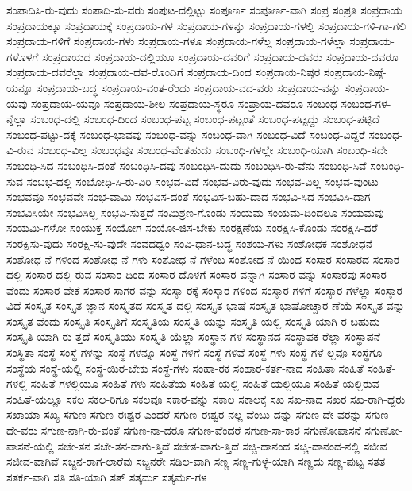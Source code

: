 {ಸಂಪಾದಿಸಿ-ರು-ವುದು
ಸಂಪಾದಿ-ಸು-ವರು
ಸಂಪುಟ-ದಲ್ಲಿಟ್ಟು
ಸಂಪೂರ್ಣ
ಸಂಪೂರ್ಣ-ವಾಗಿ
ಸಂಪ್ರ
ಸಂಪ್ರತಿ
ಸಂಪ್ರದಾಯ
ಸಂಪ್ರದಾಯಕ್ಕೂ
ಸಂಪ್ರದಾಯಕ್ಕೆ
ಸಂಪ್ರದಾಯ-ಗಳ
ಸಂಪ್ರದಾಯ-ಗಳನ್ನು
ಸಂಪ್ರದಾಯ-ಗಳಲ್ಲಿ
ಸಂಪ್ರದಾಯ-ಗಳಿ-ಗಾ-ಗಲಿ
ಸಂಪ್ರದಾಯ-ಗಳಿಗೆ
ಸಂಪ್ರದಾಯ-ಗಳು
ಸಂಪ್ರದಾಯ-ಗಳೂ
ಸಂಪ್ರದಾಯ-ಗಳೆಲ್ಲ
ಸಂಪ್ರದಾಯ-ಗಳೆಲ್ಲಾ
ಸಂಪ್ರದಾಯ-ಗಳೊಳಗೆ
ಸಂಪ್ರದಾಯದ
ಸಂಪ್ರದಾಯ-ದಲ್ಲಿಯೂ
ಸಂಪ್ರದಾಯ-ದವರಿಗೆ
ಸಂಪ್ರದಾಯ-ದವರು
ಸಂಪ್ರದಾಯ-ದವರೂ
ಸಂಪ್ರದಾಯ-ದವರೆಲ್ಲಾ
ಸಂಪ್ರದಾಯ-ದವ-ರೊಂದಿಗೆ
ಸಂಪ್ರದಾಯ-ದಿಂದ
ಸಂಪ್ರದಾಯ-ನಿಷ್ಠರ
ಸಂಪ್ರದಾಯ-ನಿಷ್ಠೆ-ಯನ್ನೂ
ಸಂಪ್ರದಾಯ-ಬದ್ಧ
ಸಂಪ್ರದಾಯ-ವಂತ-ರೆಂದು
ಸಂಪ್ರದಾಯ-ವದ-ವರು
ಸಂಪ್ರದಾಯ-ವನ್ನು
ಸಂಪ್ರದಾಯ-ಯವು
ಸಂಪ್ರದಾಯ-ಯವೂ
ಸಂಪ್ರದಾಯ-ಶೀಲ
ಸಂಪ್ರದಾಯ-ಸ್ಥರೂ
ಸಂಪ್ರಾಯ-ದವರೂ
ಸಂಬಂಧ
ಸಂಬಂಧ-ಗಳ-ನ್ನೆಲ್ಲಾ
ಸಂಬಂಧ-ದಲ್ಲಿ
ಸಂಬಂಧ-ದಿಂದ
ಸಂಬಂಧ-ಪಟ್ಟ
ಸಂಬಂಧ-ಪಟ್ಟಂತೆ
ಸಂಬಂಧ-ಪಟ್ಟದ್ದು
ಸಂಬಂಧ-ಪಟ್ಟಿದೆ
ಸಂಬಂಧ-ಪಟ್ಟು-ದಕ್ಕೆ
ಸಂಬಂಧ-ಭಾವವು
ಸಂಬಂಧ-ವನ್ನು
ಸಂಬಂಧ-ವಾಗಿ
ಸಂಬಂಧ-ವಿದೆ
ಸಂಬಂಧ-ವಿದ್ದರೆ
ಸಂಬಂಧ-ವಿ-ರುವ
ಸಂಬಂಧ-ವಿಲ್ಲ
ಸಂಬಂಧವೂ
ಸಂಬಂಧ-ವೆಂತಹುದು
ಸಂಬಂಧಿ-ಗಳಲ್ಲೇ
ಸಂಬಂಧಿ-ಯಾಗಿ
ಸಂಬಂಧಿ-ಸದೇ
ಸಂಬಂಧಿ-ಸಿದ
ಸಂಬಂಧಿಸಿ-ದಂತೆ
ಸಂಬಂಧಿಸಿ-ದವು
ಸಂಬಂಧಿಸಿ-ದುದು
ಸಂಬಂಧಿಸಿ-ರು-ವೆನು
ಸಂಬಂಧಿ-ಸಿವೆ
ಸಂಬಂಧಿ-ಸುವ
ಸಂಬಭ-ದಲ್ಲಿ
ಸಂಬೋಧಿ-ಸಿ-ರು-ವಿರಿ
ಸಂಭವ-ವಿದೆ
ಸಂಭವ-ವಿರು-ವುದು
ಸಂಭವ-ವಿಲ್ಲ
ಸಂಭವ-ವುಂಟು
ಸಂಭವವೂ
ಸಂಭವವೇ
ಸಂಭ-ವಾಮಿ
ಸಂಭವಿಸ-ದಂತೆ
ಸಂಭವಿಸ-ಬಹು-ದಾದ
ಸಂಭವಿ-ಸಿದ
ಸಂಭವಿಸಿ-ದಾಗ
ಸಂಭವಿಸಿಯೇ
ಸಂಭವಿಸಿಲ್ಲ
ಸಂಭವಿ-ಸುತ್ತದೆ
ಸಂಮಿಶ್ರಣ-ಗೊಂಡು
ಸಂಯಮ
ಸಂಯಮ-ದಿಂದಲೂ
ಸಂಯಮವು
ಸಂಯಮಿ-ಗಳೋ
ಸಂಯುಕ್ತ
ಸಂಯೋಗ
ಸಂಯೋ-ಜಿಸ-ಬೇಕು
ಸಂರಕ್ಷಣೆಯ
ಸಂರಕ್ಷಿಸಿ-ಕೊಂಡು
ಸಂರಕ್ಷಿಸಿ-ದರೆ
ಸಂರಕ್ಷಿಸು-ವುದು
ಸಂರಕ್ಷಿ-ಸು-ವುದೇ
ಸಂವದಧ್ವಂ
ಸಂವಿ-ಧಾನ-ಬದ್ಧ
ಸಂಶಯ-ಗಳು
ಸಂಶೋಧಕ
ಸಂಶೋಧನೆ
ಸಂಶೋಧ-ನೆ-ಗಳಿಂದ
ಸಂಶೋಧ-ನೆ-ಗಳು
ಸಂಶೋಧ-ನೆ-ಗಳೆಂಬ
ಸಂಶೋಧ-ನೆ-ಯಿಂದ
ಸಂಸಾರ
ಸಂಸಾರದ
ಸಂಸಾರ-ದಲ್ಲಿ
ಸಂಸಾರ-ದಲ್ಲಿ-ರುವ
ಸಂಸಾರ-ದಿಂದ
ಸಂಸಾರ-ದೊಳಗೆ
ಸಂಸಾರ-ವನ್ನಾಗಿ
ಸಂಸಾರ-ವನ್ನು
ಸಂಸಾರವು
ಸಂಸಾರ-ವೆಂದು
ಸಂಸಾರ-ವೇಕೆ
ಸಂಸಾರ-ಸಾಗರ-ವನ್ನು
ಸಂಸ್ಕಾ-ರಕ್ಕೆ
ಸಂಸ್ಕಾರ-ಗಳಿಂದ
ಸಂಸ್ಕಾರ-ಗಳಿಗೆ
ಸಂಸ್ಕಾರ-ಗಳೆಲ್ಲಾ
ಸಂಸ್ಕಾರ-ವಿದೆ
ಸಂಸ್ಕೃತ
ಸಂಸ್ಕೃತ-ಜ್ಞಾನ
ಸಂಸ್ಕೃತದ
ಸಂಸ್ಕೃತ-ದಲ್ಲಿ
ಸಂಸ್ಕೃತ-ಭಾಷೆ
ಸಂಸ್ಕೃತ-ಭಾಷೋಚ್ಚಾರ-ಣೆಯೆ
ಸಂಸ್ಕೃತ-ವನ್ನು
ಸಂಸ್ಕೃತ-ವೆಂದು
ಸಂಸ್ಕೃತಿ
ಸಂಸ್ಕೃತಿಗೆ
ಸಂಸ್ಕೃತಿಯ
ಸಂಸ್ಕೃತಿ-ಯನ್ನು
ಸಂಸ್ಕೃತಿ-ಯಲ್ಲಿ
ಸಂಸ್ಕೃತಿ-ಯಾಗಿ-ರ-ಬಹುದು
ಸಂಸ್ಕೃತಿ-ಯಾಗಿ-ರು-ತ್ತದೆ
ಸಂಸ್ಕೃತಿಯು
ಸಂಸ್ಕೃತಿ-ಯೆಲ್ಲಾ
ಸಂಸ್ಥಾನ-ಗಳ
ಸಂಸ್ಥಾನದ
ಸಂಸ್ಥಾಪಕ-ರೆಲ್ಲಾ
ಸಂಸ್ಥಾಪನೆ
ಸಂಸ್ಥಿತಾ
ಸಂಸ್ಥೆ
ಸಂಸ್ಥೆ-ಗಳನ್ನು
ಸಂಸ್ಥೆ-ಗಳನ್ನೂ
ಸಂಸ್ಥೆ-ಗಳಿಗೆ
ಸಂಸ್ಥೆ-ಗಳಿವೆ
ಸಂಸ್ಥೆ-ಗಳು
ಸಂಸ್ಥೆ-ಗಳೆ-ಲ್ಲವೂ
ಸಂಸ್ಥೆಗೂ
ಸಂಸ್ಥೆಯ
ಸಂಸ್ಥೆ-ಯಲ್ಲಿ
ಸಂಸ್ಥೆ-ಯಿರ-ಬೇಕು
ಸಂಸ್ಧೆ-ಗಳು
ಸಂಹಾ-ರಕ
ಸಂಹಾರ-ಕರ್ತ-ನಾದ
ಸಂಹಿತಾ
ಸಂಹಿತೆ
ಸಂಹಿತೆ-ಗಳಲ್ಲಿ
ಸಂಹಿತೆ-ಗಳಲ್ಲಿಯೂ
ಸಂಹಿತೆ-ಗಳು
ಸಂಹಿತೆಯ
ಸಂಹಿತೆ-ಯಲ್ಲಿ
ಸಂಹಿತೆ-ಯಲ್ಲಿಯೂ
ಸಂಹಿತೆ-ಯಲ್ಲಿರುವ
ಸಂಹಿತೆ-ಯಲ್ಲೂ
ಸಕಲ
ಸಕಲ-ರಿಗೂ
ಸಕಲವೂ
ಸಕಾರ-ವನ್ನು
ಸಕಾಲ
ಸಕಾಲಕ್ಕೆ
ಸಖ
ಸಖ-ನಾದ
ಸಖರ
ಸಖ-ರಾಗಿ-ದ್ದರು
ಸಖಾಯಾ
ಸಖ್ಯ
ಸಗುಣ
ಸಗುಣ-ಈಶ್ವರ-ಎಂದರೆ
ಸಗುಣ-ಈಶ್ವರ-ನಲ್ಲ-ವೆಂಬು-ದನ್ನು
ಸಗುಣ-ದೇ-ವರನ್ನು
ಸಗುಣ-ದೇ-ವರು
ಸಗುಣ-ನಾಗಿ-ರು-ವಂತೆ
ಸಗುಣ-ನಾ-ದರೂ
ಸಗುಣ-ವೆಂದರೆ
ಸಗುಣ-ಸಾ-ಕಾರ
ಸಗುಣೋಪಾಸನೆ
ಸಗುಣೋ-ಪಾಸನೆ-ಯಲ್ಲಿ
ಸಚೇ-ತನ
ಸಚೇ-ತನ-ವಾಗು-ತ್ತಿದೆ
ಸಚೇತ-ವಾಗು-ತ್ತಿದೆ
ಸಚ್ಚಿ-ದಾನಂದ
ಸಚ್ಚಿ-ದಾನಂದ-ನಲ್ಲಿ
ಸಜೀವ
ಸಜೀವ-ವಾಗಿವೆ
ಸಜ್ಜನ-ರಾಗ-ಲಾರೆವು
ಸಜ್ಜನರೇ
ಸಡಿಲ-ವಾಗಿ
ಸಣ್ಣ
ಸಣ್ಣ-ಗುಳ್ಳೆ-ಯಾಗಿ
ಸಣ್ಣದು
ಸಣ್ಣ-ಪುಟ್ಟ
ಸತತ
ಸತರ್ಕ-ವಾಗಿ
ಸತಿ
ಸತಿ-ಯಾಗಿ
ಸತ್
ಸತ್ಕರ್ಮ
ಸತ್ಕರ್ಮ-ಗಳ
}
